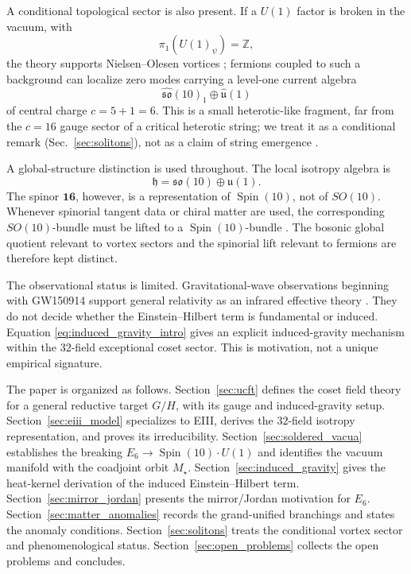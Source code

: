 \documentclass[aps,prd,preprint,longbibliography,nofootinbib,superscriptaddress,floatfix]{revtex4-2}
\newcommand{\Spin}{\operatorname{Spin}}
\begin{document}
A conditional topological sector is also present. If a \(U(1)\) factor is broken
in the vacuum, with
\begin{equation}
    \pi_1(U(1)_\psi)=\mathbb Z,
    \label{eq:u1_winding_intro}
\end{equation}
the theory supports Nielsen--Olesen vortices \cite{NielsenOlesen}; fermions
coupled to such a background can localize zero modes carrying a level-one
current algebra
\begin{equation}
    \widehat{\mathfrak{so}}(10)_1
    \oplus
    \widehat{\mathfrak u}(1)
    \label{eq:heterotic_current_intro}
\end{equation}
of central charge \(c=5+1=6\). This is a small heterotic-like fragment, far
from the \(c=16\) gauge sector of a critical heterotic string; we treat it as a
conditional remark (Sec.~\ref{sec:solitons}), not as a claim of string
emergence \cite{GreenSchwarzWitten1,Polchinski2}.

A global-structure distinction is used throughout. The local isotropy algebra is
\begin{equation}
    \mathfrak h
    =
    \mathfrak{so}(10)\oplus\mathfrak u(1).
    \label{eq:local_isotropy_intro}
\end{equation}
The spinor \(\mathbf{16}\), however, is a representation of \(\Spin(10)\), not
of \(SO(10)\). Whenever spinorial tangent data or chiral matter are used, the
corresponding \(SO(10)\)-bundle must be lifted to a \(\Spin(10)\)-bundle
\cite{LawsonMichelsohn,Nakahara}. The bosonic global quotient relevant to
vortex sectors and the spinorial lift relevant to fermions are therefore kept
distinct.

The observational status is limited. Gravitational-wave observations beginning
with GW150914 support general relativity as an infrared effective theory
\cite{LIGOObservation,LIGOTestsGR}. They do not decide whether the
Einstein--Hilbert term is fundamental or induced. Equation
\eqref{eq:induced_gravity_intro} gives an explicit induced-gravity mechanism
within the \(32\)-field exceptional coset sector. This is motivation, not a
unique empirical signature.

The paper is organized as follows. Section~\ref{sec:ucft} defines the coset
field theory for a general reductive target \(G/H\), with its gauge and
induced-gravity setup. Section~\ref{sec:eiii_model} specializes to EIII, derives
the \(32\)-field isotropy representation, and proves its irreducibility.
Section~\ref{sec:soldered_vacua} establishes the breaking
\(E_6\to\Spin(10)\cdot U(1)\) and identifies the vacuum manifold with the
coadjoint orbit \(M_\star\). Section~\ref{sec:induced_gravity} gives the
heat-kernel derivation of the induced Einstein--Hilbert term.
Section~\ref{sec:mirror_jordan} presents the mirror/Jordan motivation for
\(E_6\). Section~\ref{sec:matter_anomalies} records the grand-unified branchings
and states the anomaly conditions. Section~\ref{sec:solitons} treats the
conditional vortex sector and phenomenological status.
Section~\ref{sec:open_problems} collects the open problems and concludes.
\end{document}
